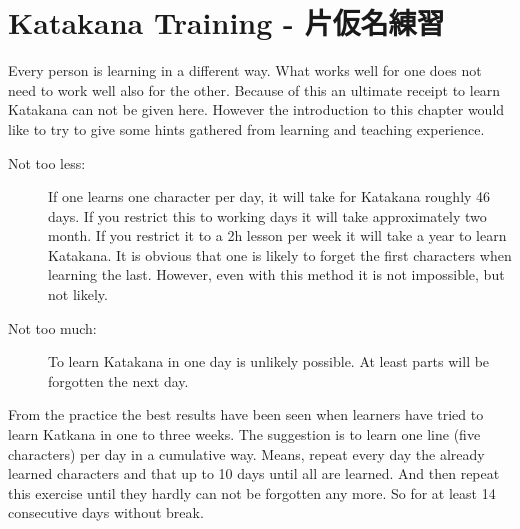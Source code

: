 \chapter{Katakana Training - 片仮名練習}\label{chap:KatakanaTraining}

\normalsize

Every person is learning in a different way. What works well for one does not
need to work well also for the other. Because of this an ultimate receipt to
learn Katakana can not be given here. However the introduction to this chapter
would like to try to give some  hints gathered from learning and teaching
experience. 

\begin{description}

\item[Not too less:] If one learns one character per day, it will take for
Katakana roughly 46 days.  If you restrict this to working days it will take
approximately two month. If you restrict it to a 2h lesson per week it will
take a year to learn Katakana. It is obvious that one is likely to forget the
first characters when learning the last. However, even with this method it is
not impossible, but not likely.

\item[Not too much:]  To learn Katakana in one day is unlikely possible. At
least parts will be forgotten the next day.

\end{description}

From the practice the best results have been seen when learners have tried to
learn Katkana in one to three weeks. The suggestion is to learn one line (five
characters) per day in a cumulative way. Means, repeat every day the already
learned characters and that up to 10 days until all are learned. And then
repeat this exercise until they hardly can not be forgotten any more. So for
at least 14 consecutive days without break. 


